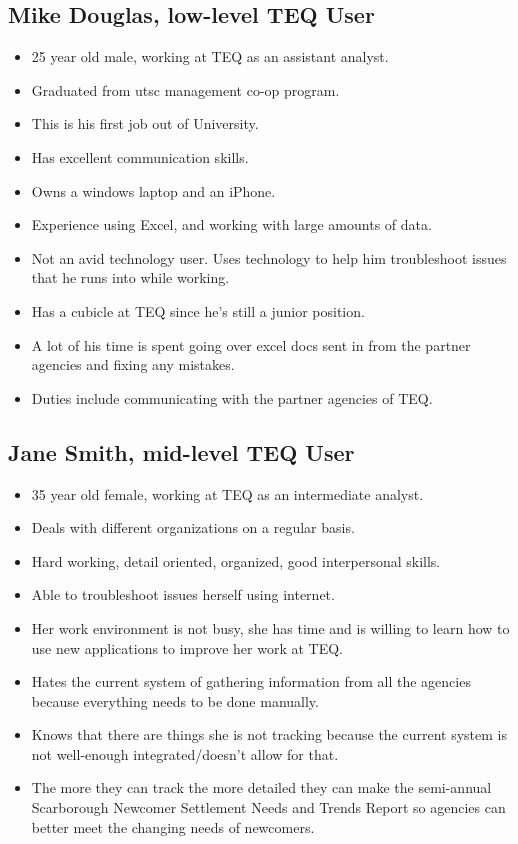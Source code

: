 \documentclass[12pt]{article}
\begin{document}
\subsection{Mike Douglas, low-level TEQ User}
\begin{itemize}%
\item 25 year old male, working at TEQ as an assistant analyst.
\item Graduated from utsc management co-op program.
\item This is his first job out of University.
\item Has excellent communication skills.
\item Owns a windows laptop and an iPhone.
\item Experience using Excel, and working with large amounts of data.
\item Not an avid technology user. Uses technology to help him troubleshoot issues that he runs into while working.
\item Has a cubicle at TEQ since he’s still a junior position.
\item A lot of his time is spent going over excel docs sent in from the partner agencies and fixing any mistakes.
\item Duties include communicating with the partner agencies of TEQ.

 \end{itemize}
 
 \subsection{Jane Smith, mid-level TEQ User}
\begin{itemize}%
\item 35 year old female, working at TEQ as an intermediate analyst.
\item Deals with different organizations on a regular basis.
\item Hard working, detail oriented, organized, good interpersonal skills.
\item Able to troubleshoot issues herself using internet.
\item Her work environment is not busy, she has time and is willing to learn how to use new applications to improve her work at TEQ.
\item Hates the current system of gathering information from all the agencies because everything needs to be done manually.
\item Knows that there are things she is not tracking because the current system is not well-enough integrated/doesn’t allow for that.
\item The more they can track the more detailed they can make the semi-annual Scarborough Newcomer Settlement Needs and Trends Report so agencies can better meet the changing needs of newcomers.
 \end{itemize}
 
\end{document}
